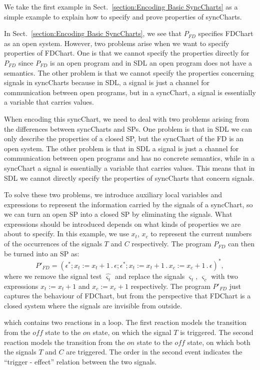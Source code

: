 \documentclass{fcs}
\newcommand{\sig}[0]{\varsigma}
\DeclareMathOperator{\seq}{;}
\DeclareMathOperator{\nex}{.}
\begin{document}
\ifx
We take the first example in Sect.~\ref{section:Encoding Basic SyncCharts} as a simple example to explain how to specify and prove properties of syncCharts.

In Sect.~\ref{section:Encoding Basic SyncCharts}, we see that $P_{\mathit{FD}}$ specifies FDChart as an open system. However, two problems arise when we want to specify properties of FDChart.
One is that we cannot specify the properties directly for $P_{\mathit{FD}}$ since $P_{\mathit{FD}}$ is an open program and in SDL
an open program does not have a semantics.
The other problem is that we cannot specify the properties concerning signals in syncCharts because in SDL, a signal is just a channel for communication between open programs, but in a syncChart, a signal is essentially a variable that carries values.

\ifx
When encoding this syncChart, we need to deal with two problems arising from the differences between syncCharts and SPs.
One problem is that in SDL we can only describe the properties of a closed SP, but the syncChart of the FD is an open system.
The other problem is that in SDL a signal is just a channel for communication between open programs and has no concrete semantics, while in a syncChart a signal is essentially a variable that carries values.
This means that in SDL we cannot directly specify the properties of syncCharts that concern signals.
\fi

To solve these two problems, we introduce auxiliary local variables and expressions to represent the information carried by the signals of a syncChart, so we can turn an open SP into a closed SP by eliminating the signals.
What expressions should be introduced depends on what kinds of properties we are about to specify.
In this example,
we use $x_t$, $x_c$ to represent the current numbers of the occurrences of the signals $T$ and $C$ respectively.
The program $P_{\mathit{FD}}$ can then be turned into an SP as:
$$
P'_{\mathit{FD}} = (\epsilon^*\seq x_t:=x_t + 1\nex \epsilon\seq \epsilon^*\seq x_t:=x_t + 1\nex x_c := x_c + 1\nex \epsilon)^*,
$$
where we remove the signal test $\hat{\sig_t}$ and replace the signals $\sig_t$, $\sig_c$ with two expressions $x_t:=x_t + 1$ and $x_c := x_c + 1$ respectively.
The program $P'_{\mathit{FD}}$ just captures the behaviour of FDChart, but from the perspective that FDChart is a closed system where the signals are invisible from outside.

\ifx
which contains two reactions in a loop.
The first reaction models the transition from the $\mathit{off}$ state to the $\mathit{on}$ state, on which the signal $T$ is triggered.
The second reaction models the transition from the $\mathit{on}$ state to the $\mathit{off}$ state, on which both the signals $T$ and $C$ are triggered.
The order in the second event indicates the ``trigger - effect'' relation between the two signals.
\fi
\end{document}
